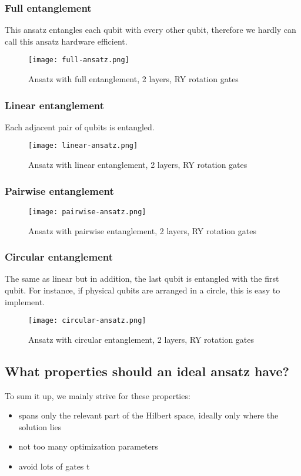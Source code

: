 \subsubsection{Full entanglement}
This ansatz entangles each qubit with every other qubit, therefore we hardly can call this ansatz hardware efficient.
\begin{figure}[H]
    \texttt{[image: full-ansatz.png]}
    \caption{Ansatz with full entanglement, 2 layers, RY rotation gates}
\end{figure}
\subsubsection{Linear entanglement}
Each adjacent pair of qubits is entangled. 
\begin{figure}[H]
    \texttt{[image: linear-ansatz.png]}
    \caption{Ansatz with linear entanglement, 2 layers, RY rotation gates}
\end{figure}
\subsubsection{Pairwise entanglement}
\begin{figure}[H]
    \texttt{[image: pairwise-ansatz.png]}
    \caption{Ansatz with pairwise entanglement, 2 layers, RY rotation gates}
\end{figure}
\subsubsection{Circular entanglement}
The same as linear but in addition, the last qubit is entangled with the first qubit. For instance, if physical qubits are arranged in a circle, this is easy to implement.
\begin{figure}[H]
    \texttt{[image: circular-ansatz.png]}
    \caption{Ansatz with circular entanglement, 2 layers, RY rotation gates}
\end{figure}

\subsection{What properties should an ideal ansatz have?}
To sum it up, we mainly strive for these properties:
\begin{itemize}
    \item spans only the relevant part of the Hilbert space, ideally only where the solution lies
    \item not too many optimization parameters
    \item avoid lots of gates t
\end{itemize}
